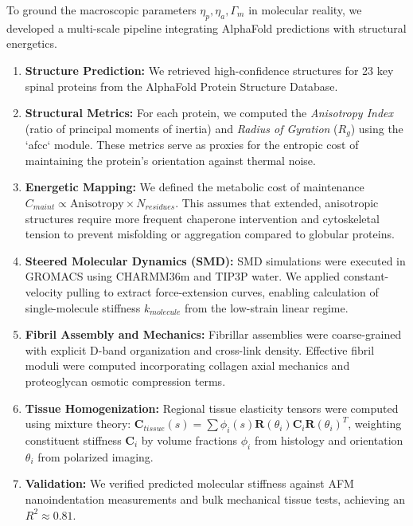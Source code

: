 \documentclass[11pt]{article}
\begin{document}
To ground the macroscopic parameters $\eta_p, \eta_a, \Gamma_m$ in molecular reality, we developed a multi-scale pipeline integrating AlphaFold predictions with structural energetics.
\begin{enumerate}
    \item \textbf{Structure Prediction:} We retrieved high-confidence structures for 23 key spinal proteins from the AlphaFold Protein Structure Database.
    \item \textbf{Structural Metrics:} For each protein, we computed the \emph{Anisotropy Index} (ratio of principal moments of inertia) and \emph{Radius of Gyration} ($R_g$) using the `afcc` module. These metrics serve as proxies for the entropic cost of maintaining the protein's orientation against thermal noise.
    \item \textbf{Energetic Mapping:} We defined the metabolic cost of maintenance $C_{maint} \propto \text{Anisotropy} \times N_{residues}$. This assumes that extended, anisotropic structures require more frequent chaperone intervention and cytoskeletal tension to prevent misfolding or aggregation compared to globular proteins.
    \item \textbf{Steered Molecular Dynamics (SMD):} SMD simulations were executed in GROMACS using CHARMM36m and TIP3P water. We applied constant-velocity pulling to extract force-extension curves, enabling calculation of single-molecule stiffness $k_{molecule}$ from the low-strain linear regime.
    \item \textbf{Fibril Assembly and Mechanics:} Fibrillar assemblies were coarse-grained with explicit D-band organization and cross-link density. Effective fibril moduli were computed incorporating collagen axial mechanics and proteoglycan osmotic compression terms.
    \item \textbf{Tissue Homogenization:} Regional tissue elasticity tensors were computed using mixture theory: $\mathbf{C}_{tissue}(s) = \sum \phi_i(s) \mathbf{R}(\theta_i) \mathbf{C}_i \mathbf{R}(\theta_i)^T$, weighting constituent stiffness $\mathbf{C}_i$ by volume fractions $\phi_i$ from histology and orientation $\theta_i$ from polarized imaging.
    \item \textbf{Validation:} We verified predicted molecular stiffness against AFM nanoindentation measurements and bulk mechanical tissue tests, achieving an $R^2 \approx 0.81$.
\end{enumerate}
\end{document}
